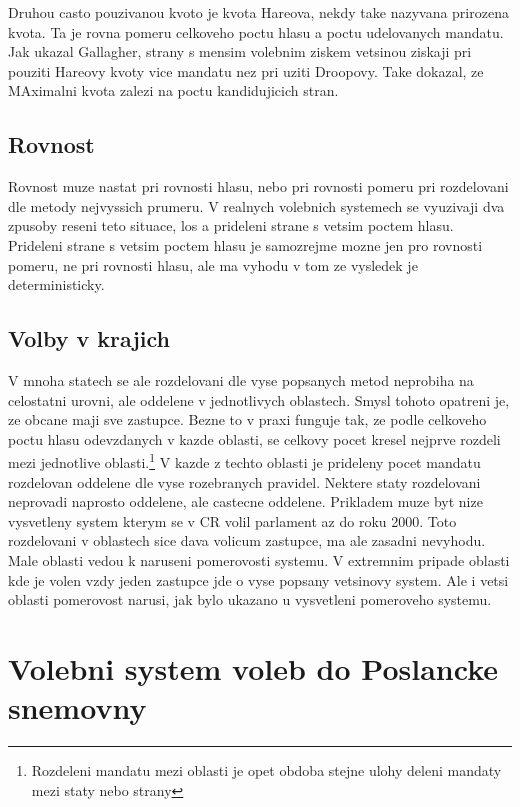 \documentclass[12pt,a4paper]{report}
\begin{document}
Druhou casto pouzivanou kvoto je kvota Hareova, nekdy take nazyvana prirozena kvota. Ta je rovna pomeru celkoveho poctu hlasu a poctu udelovanych mandatu.
Jak ukazal Gallagher, strany s mensim volebnim ziskem vetsinou ziskaji pri pouziti Hareovy kvoty vice mandatu nez pri uziti Droopovy. Take dokazal, ze MAximalni kvota zalezi na poctu kandidujicich stran.\autocite{GAL1}



\section{Rovnost}
Rovnost muze nastat pri rovnosti hlasu, nebo pri rovnosti pomeru pri rozdelovani dle metody nejvyssich prumeru.
V realnych volebnich systemech se vyuzivaji dva zpusoby reseni teto situace, los a prideleni strane s vetsim poctem hlasu. 
Prideleni strane s vetsim poctem hlasu je samozrejme mozne jen pro rovnosti pomeru, ne pri rovnosti hlasu, ale ma vyhodu v tom ze vysledek je deterministicky.


\section{Volby v krajich}
V mnoha statech se ale rozdelovani dle vyse popsanych metod neprobiha na celostatni urovni, ale oddelene v jednotlivych oblastech.
Smysl tohoto opatreni je, ze obcane maji sve  zastupce.
Bezne to v praxi funguje tak, ze podle celkoveho poctu hlasu odevzdanych v kazde oblasti, se celkovy pocet kresel nejprve rozdeli mezi jednotlive oblasti.\footnote{Rozdeleni mandatu mezi oblasti je opet obdoba stejne ulohy deleni mandaty mezi staty nebo strany}
V kazde z techto oblasti je prideleny pocet mandatu rozdelovan oddelene dle vyse rozebranych pravidel.
Nektere staty rozdelovani neprovadi naprosto oddelene, ale castecne oddelene.
Prikladem muze byt nize vysvetleny system kterym se v CR volil parlament az do roku 2000.
Toto rozdelovani v oblastech sice dava volicum  zastupce, ma ale zasadni nevyhodu.
Male oblasti vedou k naruseni pomerovosti systemu.
V extremnim pripade oblasti kde je volen vzdy jeden zastupce jde o vyse popsany vetsinovy system. 
Ale i vetsi oblasti pomerovost narusi, jak bylo ukazano u vysvetleni pomeroveho systemu.

\chapter{Volebni system voleb do Poslancke snemovny}
\end{document}
